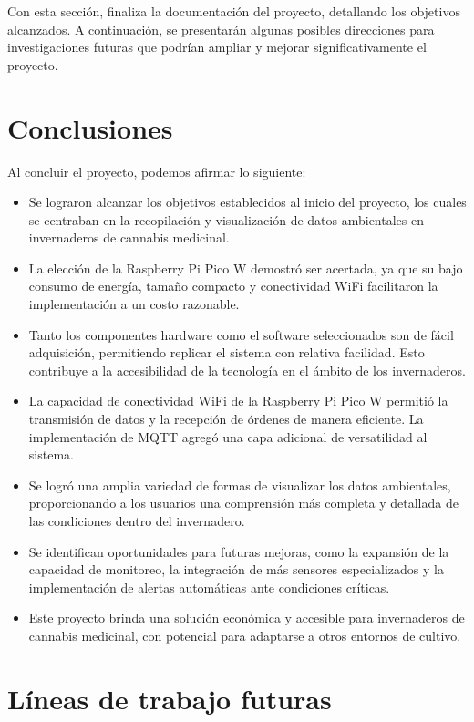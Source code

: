 
Con esta sección, finaliza la documentación del proyecto, detallando los objetivos alcanzados. A continuación, se presentarán algunas posibles direcciones para investigaciones futuras que podrían ampliar y mejorar significativamente el proyecto.

\section{Conclusiones}

Al concluir el proyecto, podemos afirmar lo siguiente:

\begin{itemize}
\item Se lograron alcanzar los objetivos establecidos al inicio del proyecto, los cuales se centraban en la recopilación y visualización de datos ambientales en invernaderos de cannabis medicinal.
\item La elección de la Raspberry Pi Pico W demostró ser acertada, ya que su bajo consumo de energía, tamaño compacto y conectividad WiFi facilitaron la implementación a un costo razonable.
\item Tanto los componentes hardware como el software seleccionados son de fácil adquisición, permitiendo replicar el sistema con relativa facilidad. Esto contribuye a la accesibilidad de la tecnología en el ámbito de los invernaderos.
\item La capacidad de conectividad WiFi de la Raspberry Pi Pico W permitió la transmisión de datos y la recepción de órdenes de manera eficiente. La implementación de MQTT agregó una capa adicional de versatilidad al sistema.
\item Se logró una amplia variedad de formas de visualizar los datos ambientales, proporcionando a los usuarios una comprensión más completa y detallada de las condiciones dentro del invernadero.
\item Se identifican oportunidades para futuras mejoras, como la expansión de la capacidad de monitoreo, la integración de más sensores especializados y la implementación de alertas automáticas ante condiciones críticas.
\item Este proyecto brinda una solución económica y accesible para invernaderos de cannabis medicinal, con potencial para adaptarse a otros entornos de cultivo.
\end{itemize}

\section{Líneas de trabajo futuras}

